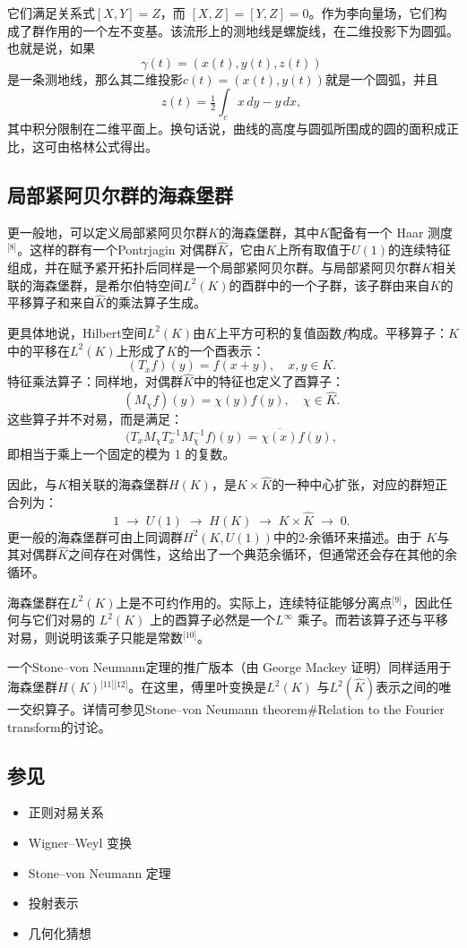 它们满足关系式$[X, Y] = Z$，而 $[X, Z] = [Y, Z] = 0$。作为李向量场，它们构成了群作用的一个左不变基。该流形上的测地线是螺旋线，在二维投影下为圆弧。也就是说，如果
$$
\gamma(t) = (x(t), y(t), z(t))~
$$
是一条测地线，那么其二维投影$c(t) = (x(t), y(t))$就是一个圆弧，并且
$$
z(t) = \tfrac{1}{2} \int_{c} x \, dy - y \, dx,~
$$
其中积分限制在二维平面上。换句话说，曲线的高度与圆弧所围成的圆的面积成正比，这可由格林公式得出。
\subsection{局部紧阿贝尔群的海森堡群}
更一般地，可以定义局部紧阿贝尔群$K$的海森堡群，其中$K$配备有一个 Haar 测度 \(^\text{[8]}\)。这样的群有一个Pontrjagin 对偶群$\hat{K}$，它由$K$上所有取值于$U(1)$的连续特征组成，并在赋予紧开拓扑后同样是一个局部紧阿贝尔群。与局部紧阿贝尔群$K$相关联的海森堡群，是希尔伯特空间$L^{2}(K)$的酉群中的一个子群，该子群由来自$K$的平移算子和来自$\hat{K}$的乘法算子生成。

更具体地说，Hilbert空间$L^{2}(K)$由$K$上平方可积的复值函数$f$构成。平移算子：$K$中的平移在$L^{2}(K)$上形成了$K$的一个酉表示：
$$
(T_{x} f)(y) = f(x+y), \quad x,y \in K.~
$$
特征乘法算子：同样地，对偶群$\hat{K}$中的特征也定义了酉算子：
$$
(M_{\chi} f)(y) = \chi(y) f(y), \quad \chi \in \hat{K}.~
$$
这些算子并不对易，而是满足：
$$
\big(T_{x} M_{\chi} T_{x}^{-1} M_{\chi}^{-1} f\big)(y) = \overline{\chi(x)} f(y),~
$$
即相当于乘上一个固定的模为 1 的复数。

因此，与$K$相关联的海森堡群$H(K)$，是$K \times \hat{K}$的一种中心扩张，对应的群短正合列为：
$$
1 \;\longrightarrow\; U(1) \;\longrightarrow\; H(K) \;\longrightarrow\; K \times \hat{K} \;\longrightarrow\; 0.~
$$
更一般的海森堡群可由上同调群$H^{2}(K, U(1))$中的2-余循环来描述。由于 $K$与其对偶群$\hat{K}$之间存在对偶性，这给出了一个典范余循环，但通常还会存在其他的余循环。

海森堡群在$L^{2}(K)$上是不可约作用的。实际上，连续特征能够分离点\(^\text{[9]}\)，因此任何与它们对易的 $L^{2}(K)$ 上的酉算子必然是一个$L^{\infty}$ 乘子。而若该算子还与平移对易，则说明该乘子只能是常数\(^\text{[10]}\)。

一个Stone–von Neumann定理的推广版本（由 George Mackey 证明）同样适用于海森堡群$H(K)$\(^\text{[11][12]}\)。在这里，傅里叶变换是$L^{2}(K)$ 与$L^{2}(\hat{K})$表示之间的唯一交织算子。详情可参见Stone–von Neumann theorem#Relation to the Fourier transform的讨论。
\subsection{参见}
\begin{itemize}
\item 正则对易关系
\item Wigner–Weyl 变换
\item Stone–von Neumann 定理
\item 投射表示
\item 几何化猜想
\end{itemize}
